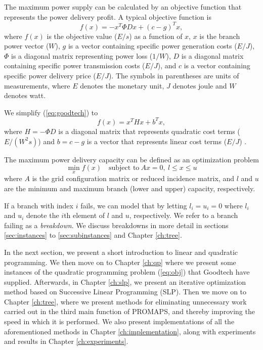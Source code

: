 \documentclass[a4paper,12pt]{report}
\begin{document}
The maximum power
supply can be calculated by an objective function that represents the power
delivery profit. A typical objective function is
\begin{equation}
f(x) = - x^T \Phi D x + (c-g)^T x, \label{eq:goodtech}
\end{equation}
where $f(x)$ is the objective value ($E/s$) as a function of $x$, $x$ is the
branch power vector ($W$), $g$ is a vector containing specific power
generation costs ($E/J$), $\Phi$ is a diagonal matrix representing power loss
($1/W$), $D$ is a diagonal matrix containing specific power transmission costs
($E/J$), and $c$ is a vector containing specific power delivery price
($E/J$). The symbols in parentheses are units of measurements, where $E$
denotes the monetary unit, $J$ denotes joule and $W$ denotes
watt\cite{digernes}.

We simplify (\ref{eq:goodtech}) to
\begin{equation}
    f(x) = x^T H x + b^T x, \label{eq:obj}
\end{equation}
where $H = - \Phi D$ is a diagonal matrix that represents quadratic cost terms
($E/(W^2 s)$) and $b = c - g$ is a vector that represents linear cost terms
($E/J$) \cite{digernes}.

The maximum power delivery capacity can be defined as an optimization problem
\begin{equation}
   \min_{x} f(x)\quad\textrm{subject to}~Ax = 0,
                             ~l \leq x \leq u \label{eq:thesisqp}
\end{equation}
where $A$ is the grid configuration matrix or reduced incidence matrix, and
$l$ and $u$ are the minimum and maximum branch (lower and upper) capacity,
respectively\cite{digernes}.

If a branch with index $i$ fails, we can model that by letting
$l_i = u_i = 0$ where $l_i$ and $u_i$ denote the $i$th element of $l$ and
$u$, respectively. We refer to a branch failing as a \textit{breakdown}.
We discuss breakdowns in more detail in sections \ref{sec:instances} to
\ref{sec:subinstances} and Chapter \ref{ch:tree}.

In the next section, we present a short introduction to linear and quadratic
programming.
We then move on to Chapter \ref{ch:qp} where we present some instances of the
quadratic programming problem (\ref{eq:obj}) that Goodtech have supplied.
Afterwards, in Chapter \ref{ch:slp}, we present
an iterative optimization method based on Successive Linear Programming (SLP).
Then we move on to Chapter \ref{ch:tree}, where we present methods for
eliminating unnecessary work carried out in the third main function of PROMAPS,
and thereby improving the speed in which it is performed.
We also present implementations of all the aforementioned methods in Chapter
\ref{ch:implementation}, along with
experiments and results in Chapter \ref{ch:experiments}.
\end{document}
